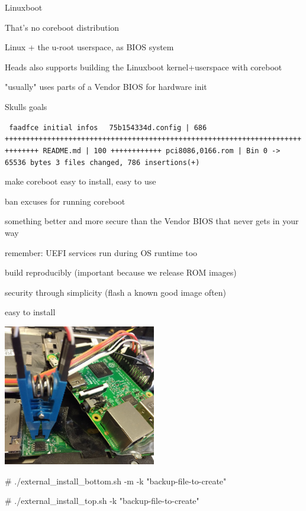 \documentclass[14pt]{beamer}
\begin{document}
\begin{frame}
Linuxboot
\end{frame}


\begin{frame}
That's no coreboot distribution
\pause

Linux + the u-root userspace, as BIOS system

Heads also supports building the Linuxboot kernel+userspace with coreboot

"usually" uses parts of a Vendor BIOS for hardware init
\end{frame}


\begin{frame}
Skulls goals
\end{frame}


\begin{frame}
\texttt{
faadfce initial infos
}
\texttt{
 75b154334d.config | 686 ++++++++++++++++++++++++++++++++++++++++++++++++++++++++++++++++++++++++++++++
 README.md         | 100 ++++++++++++
 pci8086,0166.rom  | Bin 0 -> 65536 bytes
 3 files changed, 786 insertions(+)
}
\end{frame}


\begin{frame}
make coreboot easy to install, easy to use

ban excuses for running coreboot
\pause

something better and more secure than the Vendor BIOS that never gets in your way

remember: UEFI services run during OS runtime too
\pause

build reproducibly (important because we release ROM images)

security through simplicity (flash a known good image often)
\end{frame}


\begin{frame}
easy to install
\end{frame}


\begin{frame}
\includegraphics[width=0.5\textwidth]{rpi_clip.jpg}

\# ./external\_install\_bottom.sh -m -k "backup-file-to-create"

\# ./external\_install\_top.sh -k "backup-file-to-create"
\end{frame}
\end{document}
